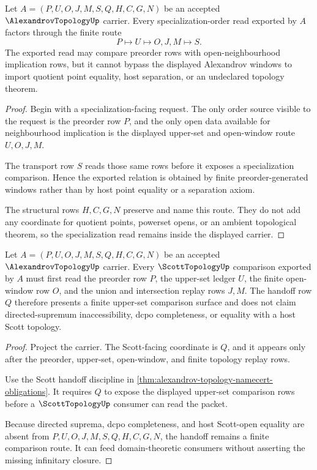 \begin{theorem}\label{thm:alexandrov-topology-preorder-specialization-route}
Let $A=(P,U,O,J,M,S,Q,H,C,G,N)$ be an accepted $\AlexandrovTopologyUp$ carrier. Every specialization-order read exported by $A$ factors through the finite route
$$
P \longmapsto U \longmapsto O,J,M \longmapsto S .
$$
The exported read may compare preorder rows with open-neighbourhood implication rows, but it cannot bypass the displayed Alexandrov windows to import quotient point equality, host separation, or an undeclared topology theorem.
\end{theorem}
\begin{proof}
Begin with a specialization-facing request. The only order source visible to the request is the preorder row $P$, and the only open data available for neighbourhood implication is the displayed upper-set and open-window route $U,O,J,M$.

The transport row $S$ reads those same rows before it exposes a specialization comparison. Hence the exported relation is obtained by finite preorder-generated windows rather than by host point equality or a separation axiom.

The structural rows $H,C,G,N$ preserve and name this route. They do not add any coordinate for quotient points, powerset opens, or an ambient topological theorem, so the specialization read remains inside the displayed carrier.
\end{proof}

\begin{theorem}\label{thm:alexandrov-topology-scott-handoff}
Let $A=(P,U,O,J,M,S,Q,H,C,G,N)$ be an accepted $\AlexandrovTopologyUp$ carrier. Every $\ScottTopologyUp$ comparison exported by $A$ must first read the preorder row $P$, the upper-set ledger $U$, the finite open-window row $O$, and the union and intersection replay rows $J,M$. The handoff row $Q$ therefore presents a finite upper-set comparison surface and does not claim directed-supremum inaccessibility, dcpo completeness, or equality with a host Scott topology.
\end{theorem}
\begin{proof}
Project the carrier. The Scott-facing coordinate is $Q$, and it appears only after the preorder, upper-set, open-window, and finite topology replay rows.

Use the Scott handoff discipline in \autoref{thm:alexandrov-topology-namecert-obligations}. It requires $Q$ to expose the displayed upper-set comparison rows before a $\ScottTopologyUp$ consumer can read the packet.

Because directed suprema, dcpo completeness, and host Scott-open equality are absent from $P,U,O,J,M,S,Q,H,C,G,N$, the handoff remains a finite comparison route. It can feed domain-theoretic consumers without asserting the missing infinitary closure.
\end{proof}

